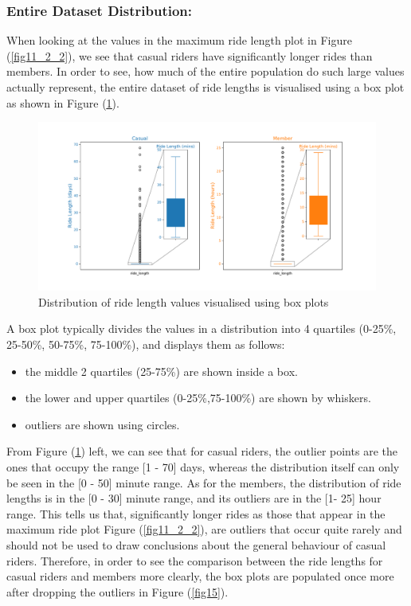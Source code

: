 \documentclass[12pt]{article}
\begin{document}
\pagebreak

\subsubsection*{Entire Dataset Distribution:}
When looking at the values in the maximum ride length plot in Figure (\underline{\ref{fig11_2_2}}), we see that casual riders have significantly longer rides than members. In order to see, how much of the entire population do such large values actually represent, the entire dataset of ride lengths is visualised using a box plot as shown in Figure (\underline{\ref{fig13}}).  

	\begin{figure}[h]
	\centering
	\includegraphics[scale=0.5]{ridelength_boxplot.pdf} 
	\caption{Distribution of ride length values visualised using box plots}
	\label{fig13}
	\end{figure}
	
A box plot typically divides the values in a distribution into 4 quartiles (0-25\%, 25-50\%, 50-75\%, 75-100\%), and displays them as follows: 
	\begin{itemize}
	\item the middle 2 quartiles (25-75\%) are shown inside a box.
	\item the lower and upper quartiles (0-25\%,75-100\%) are shown by whiskers.
	\item outliers are shown using circles. 
	\end{itemize}
From Figure (\underline{\ref{fig13}}) left, we can see that for casual riders, the outlier points are the ones that occupy the range [1 - 70] days, whereas the distribution itself can only be seen in the [0 - 50] minute range. As for the members, the distribution of ride lengths is in the [0 - 30] minute range, and its outliers are in the [1- 25] hour range. This tells us that, significantly longer rides as those that appear in the maximum ride plot Figure (\underline{\ref{fig11_2_2}}), are outliers that occur quite rarely and should not be used to draw conclusions about the general behaviour of casual riders. Therefore, in order to see the comparison between the ride lengths for casual riders and members more clearly, the box plots are populated once more after dropping the outliers in Figure (\underline{\ref{fig15}}).  \\
\end{document}
